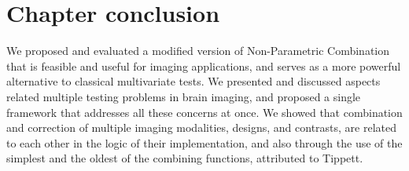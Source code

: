 \section{Chapter conclusion}

We proposed and evaluated a modified version of Non-Parametric Combination that is feasible and useful for imaging applications, and serves as a more powerful alternative to classical multivariate tests. We presented and discussed aspects related multiple testing problems in brain imaging, and proposed a single framework that addresses all these concerns at once. We showed that combination and correction of multiple imaging modalities, designs, and contrasts, are related to each other in the logic of their implementation, and also through the use of the simplest and the oldest of the combining functions, attributed to Tippett.
